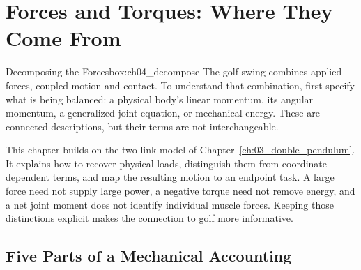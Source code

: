 \chapter{Forces and Torques: Where They Come From}
\label{ch:04_forces_and_torques}
\raggedbottom

\begin{laymansbox}{Decomposing the Forces}{box:ch04_decompose}
The golf swing combines applied forces, coupled motion and contact. To understand that combination, first specify what is being balanced: a physical body's linear momentum, its angular momentum, a generalized joint equation, or mechanical energy. These are connected descriptions, but their terms are not interchangeable.

This chapter builds on the two-link model of Chapter~\ref{ch:03_double_pendulum}. It explains how to recover physical loads, distinguish them from coordinate-dependent terms, and map the resulting motion to an endpoint task. A large force need not supply large power, a negative torque need not remove energy, and a net joint moment does not identify individual muscle forces. Keeping those distinctions explicit makes the connection to golf more informative.
\end{laymansbox}

\section{Five Parts of a Mechanical Accounting}

